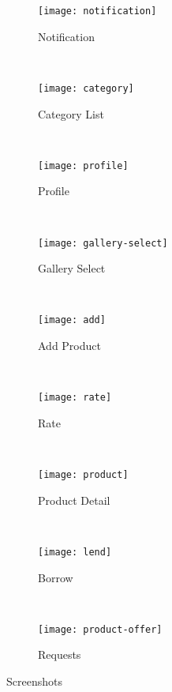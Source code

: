 \begin{figure}[!h]
    \centering
    \begin{subfigure}[b]{0.3\textwidth}
        \texttt{[image: notification]}
        \caption{Notification}
        \label{fig:notification}
    \end{subfigure}
    ~
    \begin{subfigure}[b]{0.3\textwidth}
        \texttt{[image: category]}
        \caption{Category List}
        \label{fig:category}
    \end{subfigure}
    ~
   \begin{subfigure}[b]{0.3\textwidth}
        \texttt{[image: profile]}
        \caption{Profile}
        \label{fig:profile}
    \end{subfigure}
    ~
    \begin{subfigure}[b]{0.3\textwidth}
        \texttt{[image: gallery-select]}
        \caption{Gallery Select}
        \label{fig:gallery-select}
    \end{subfigure}
    ~
    \begin{subfigure}[b]{0.3\textwidth}
        \texttt{[image: add]}
        \caption{Add Product}
        \label{fig:add}
    \end{subfigure}
    ~
    \begin{subfigure}[b]{0.3\textwidth}
        \texttt{[image: rate]}
        \caption{Rate}
        \label{fig:rate}
    \end{subfigure}
    ~
    \begin{subfigure}[b]{0.3\textwidth}
        \texttt{[image: product]}
        \caption{Product Detail}
        \label{fig:product}
    \end{subfigure}
    ~
    \begin{subfigure}[b]{0.3\textwidth}
        \texttt{[image: lend]}
        \caption{Borrow}
        \label{fig:lend}
    \end{subfigure}
    ~
    \begin{subfigure}[b]{0.3\textwidth}
        \texttt{[image: product-offer]}
        \caption{Requests}
        \label{fig:requests}
    \end{subfigure}
    \caption{Screenshots}\label{fig:scr4}
\end{figure}